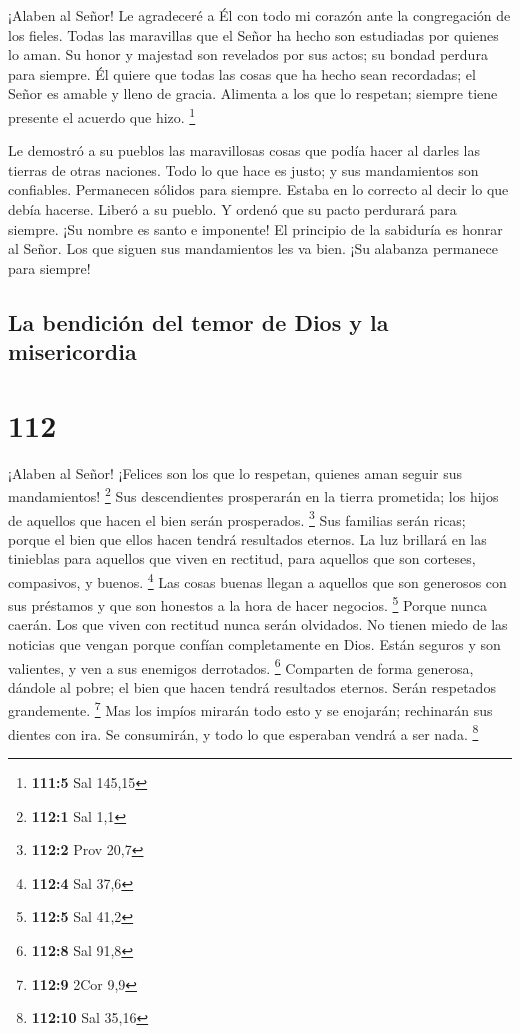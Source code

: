  ¡Alaben al Señor! Le agradeceré a Él con todo mi corazón
ante la congregación de los fieles.  Todas las maravillas
que el Señor ha hecho son estudiadas por quienes lo aman. 
Su honor y majestad son revelados por sus actos; su bondad perdura para
siempre.  Él quiere que todas las cosas que ha hecho sean
recordadas; el Señor es amable y lleno de gracia.  Alimenta
a los que lo respetan; siempre tiene presente el acuerdo que hizo.
\footnote{\textbf{111:5} Sal 145,15}

 Le demostró a su pueblos las maravillosas cosas que podía
hacer al darles las tierras de otras naciones.  Todo lo que
hace es justo; y sus mandamientos son confiables. 
Permanecen sólidos para siempre. Estaba en lo correcto al decir lo que
debía hacerse.  Liberó a su pueblo. Y ordenó que su pacto
perdurará para siempre. ¡Su nombre es santo e imponente! 
El principio de la sabiduría es honrar al Señor. Los que siguen sus
mandamientos les va bien. ¡Su alabanza permanece para siempre!

\hypertarget{la-bendiciuxf3n-del-temor-de-dios-y-la-misericordia}{%
\subsection{La bendición del temor de Dios y la
misericordia}\label{la-bendiciuxf3n-del-temor-de-dios-y-la-misericordia}}

\hypertarget{section-111}{%
\section{112}\label{section-111}}

 ¡Alaben al Señor! ¡Felices son los que lo respetan, quienes
aman seguir sus mandamientos! \footnote{\textbf{112:1} Sal 1,1}
 Sus descendientes prosperarán en la tierra prometida; los
hijos de aquellos que hacen el bien serán prosperados. \footnote{\textbf{112:2}
  Prov 20,7}  Sus familias serán ricas; porque el bien que
ellos hacen tendrá resultados eternos.  La luz brillará en
las tinieblas para aquellos que viven en rectitud, para aquellos que son
corteses, compasivos, y buenos. \footnote{\textbf{112:4} Sal 37,6}
 Las cosas buenas llegan a aquellos que son generosos con
sus préstamos y que son honestos a la hora de hacer negocios.
\footnote{\textbf{112:5} Sal 41,2}  Porque nunca caerán. Los
que viven con rectitud nunca serán olvidados.  No tienen
miedo de las noticias que vengan porque confían completamente en Dios.
 Están seguros y son valientes, y ven a sus enemigos
derrotados. \footnote{\textbf{112:8} Sal 91,8}  Comparten de
forma generosa, dándole al pobre; el bien que hacen tendrá resultados
eternos. Serán respetados grandemente. \footnote{\textbf{112:9} 2Cor 9,9}
 Mas los impíos mirarán todo esto y se enojarán; rechinarán
sus dientes con ira. Se consumirán, y todo lo que esperaban vendrá a ser
nada. \footnote{\textbf{112:10} Sal 35,16}

